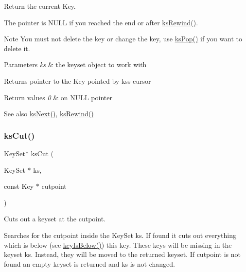 Return the current Key. 

The pointer is N\+U\+LL if you reached the end or after \mbox{\hyperlink{group__keyset_gabe793ff51f1728e3429c84a8a9086b70}{ks\+Rewind()}}.

\begin{DoxyNote}{Note}
You must not delete the key or change the key, use \mbox{\hyperlink{group__keyset_gae42530b04defb772059de0600159cf69}{ks\+Pop()}} if you want to delete it.
\end{DoxyNote}

\begin{DoxyParams}{Parameters}
{\em ks} & the keyset object to work with \\
\hline
\end{DoxyParams}
\begin{DoxyReturn}{Returns}
pointer to the Key pointed by {\ttfamily ks\textquotesingle{}s} cursor 
\end{DoxyReturn}

\begin{DoxyRetVals}{Return values}
{\em 0} & on N\+U\+LL pointer \\
\hline
\end{DoxyRetVals}
\begin{DoxySeeAlso}{See also}
\mbox{\hyperlink{group__keyset_ga317321c9065b5a4b3e33fe1c399bcec9}{ks\+Next()}}, \mbox{\hyperlink{group__keyset_gabe793ff51f1728e3429c84a8a9086b70}{ks\+Rewind()}} 
\end{DoxySeeAlso}
\mbox{\label{group__keyset_ga6b00cf82b59af4d883a9bad6cf4a4a4a}} 
\subsubsection{\texorpdfstring{ksCut()}{ksCut()}}
{\footnotesize\ttfamily Key\+Set$\ast$ ks\+Cut (\begin{DoxyParamCaption}\item[{Key\+Set $\ast$}]{ks,  }\item[{const Key $\ast$}]{cutpoint }\end{DoxyParamCaption})}



Cuts out a keyset at the cutpoint. 

Searches for the cutpoint inside the Key\+Set ks. If found it cuts out everything which is below (see \mbox{\hyperlink{group__keytest_ga03332b5d97c76a4fd2640aca4762b8df}{key\+Is\+Below()}}) this key. These keys will be missing in the keyset {\ttfamily ks}. Instead, they will be moved to the returned keyset. If {\ttfamily cutpoint} is not found an empty keyset is returned and {\ttfamily ks} is not changed.

